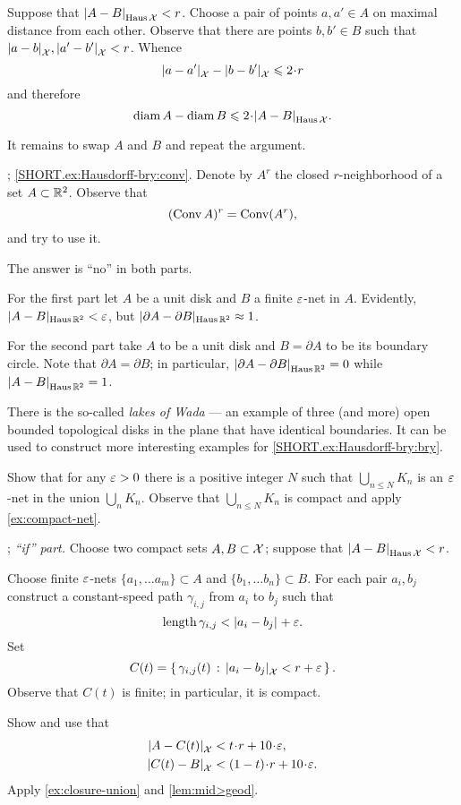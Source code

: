 Suppose that $\dist{A}{B}{\Haus\spc{X}}<r$.
Choose a pair of points $a,a'\in A$ on maximal distance from each other.
Observe that there are points $b,b'\in B$ such that 
$\dist{a}{b}{\spc{X}},\dist{a'}{b'}{\spc{X}}<r$.
Whence 
\[\dist{a}{a'}{\spc{X}}-\dist{b}{b'}{\spc{X}}\le 2\cdot r\]
and therefore
\[\diam A-\diam B\le 2\cdot\dist{A}{B}{\Haus\spc{X}}.\]

It remains to swap $A$ and $B$ and repeat the argument.


\parbf{\ref{ex:Hausdorff-bry}}; \ref{SHORT.ex:Hausdorff-bry:conv}.
Denote by $A^r$ the closed $r$-neighborhood of a set $A\z\subset \RR^2$.
Observe  that 
\[(\mathop{\rm Conv}\nolimits A)^r=\mathop{\rm Conv}\nolimits(A^r),\]
and try to use it.

The answer is ``no'' in both parts.

For the first part let $A$ be a unit disk and $B$ a finite $\varepsilon$-net in $A$.
Evidently, $|A-B|_{\operatorname{\rm Haus}\nolimits\mathbb{R}^2}<\varepsilon$, 
but
$|\partial A-\partial B|_{\operatorname{\rm Haus}\nolimits\mathbb{R}^2}\approx 1$.

For the second part take $A$ to be a unit disk and $B=\partial A$ to be its boundary circle.
Note that $\partial A=\partial B$; in particular, $\dist{\partial A}{\partial B}{\Haus\RR^2}=0$ while $\dist{ A}{B}{\Haus\RR^2}=1$.

There is the so-called {}\emph{lakes of Wada} --- an example of three (and more) open bounded topological disks in the plane that have identical boundaries.
It can be used to construct more interesting examples for \ref{SHORT.ex:Hausdorff-bry:bry}.

Show that for any $\varepsilon>0$ there is a positive integer $N$ such that $\bigcup_{n\le N} K_n$ is an $\varepsilon$-net in the union $\bigcup_{n} K_n$.
Observe that $\bigcup_{n\le N} K_n$
is compact and apply \ref{ex:compact-net}.

\parbf{\ref{ex:Haus-length}}; \textit{``if'' part.}
Choose two compact sets $A,B\subset \mathcal{X}$;
suppose that $\dist{A}{B}{\Haus\spc{X}}<r$.

Choose finite $\varepsilon$-nets $\{a_1,\dots a_m\}\subset A$ and $\{b_1,\dots b_n\}\subset B$.
For each pair $a_i,b_j$ construct a constant-speed path $\gamma_{i,j}$ from $a_i$ to $b_j$ such that 
\[\length \gamma_{i,j}<\dist{a_i}{b_j}{}+\eps.\]
Set 
\[C(t)=\set{\gamma_{i,j}(t)}{\dist{a_i}{b_j}{\spc{X}}<r+\eps}.\]
Observe that $C(t)$ is finite; in particular, it is compact.

Show and use that 
\begin{align*}
\dist{A}{C(t)}{\spc{X}}&<t\cdot r+10\cdot\eps,
\\
\dist{C(t)}{B}{\spc{X}}&<(1-t)\cdot r+10\cdot\eps.
\end{align*}
Apply \ref{ex:closure-union} and \ref{lem:mid>geod}.

